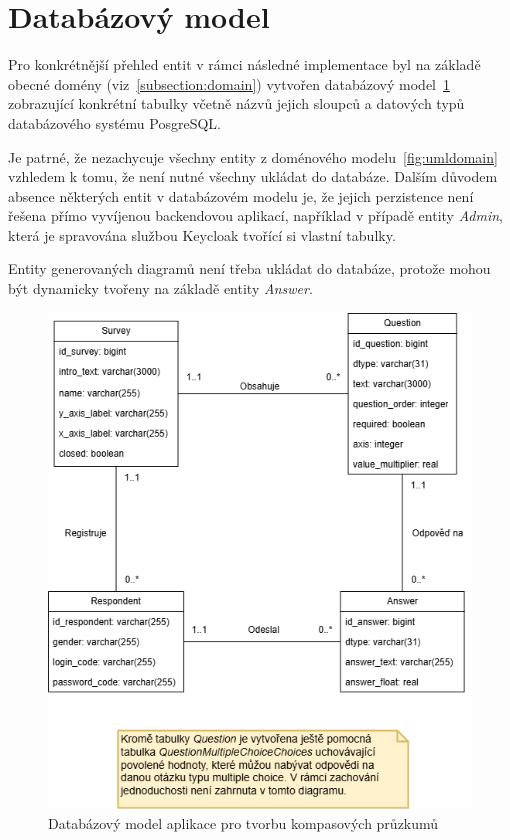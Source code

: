 \section{Databázový model}
\label{subsection:datamodel}
Pro konkrétnější přehled entit v rámci následné implementace byl na základě obecné
domény (viz~\ref{subsection:domain}) vytvořen databázový model~\ref{fig:datamodelnew} zobrazující konkrétní
tabulky včetně názvů jejich sloupců a datových typů databázového systému PosgreSQL.

Je patrné, že nezachycuje všechny entity z doménového modelu~\ref{fig:umldomain} vzhledem
k tomu, že není nutné všechny ukládat do databáze. Dalším důvodem
absence některých entit v databázovém modelu je, že jejich perzistence není 
řešena přímo vyvíjenou backendovou aplikací, například v případě entity \textit{Admin}, která
je spravována službou Keycloak tvořící si vlastní tabulky.

Entity generovaných diagramů není třeba ukládat do databáze, protože mohou být 
dynamicky tvořeny na základě entity \textit{Answer}.

\begin{figure}[h!]
    \centering
    \includegraphics[width=\textwidth]{images/datamodel.drawio.png}
    \caption{Databázový model aplikace pro tvorbu kompasových průzkumů}
    \label{fig:datamodelnew}
\end{figure}

